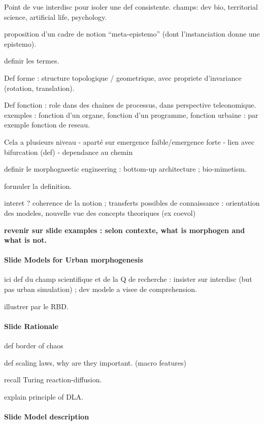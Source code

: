 \documentclass[11pt]{article}
\begin{document}
Point de vue interdisc pour isoler une def consistente. champs: dev bio, territorial science, artificial life, psychology.

proposition d'un cadre de notion ``meta-epistemo'' (dont l'instanciation donne une epistemo).

definir les termes.

Def forme : structure topologique / geometrique, avec propriete d'invariance (rotation, translation).

Def fonction : role dans des chaines de processus, dans perspective teleonomique. exemples : fonction d'un organe, fonction d'un programme, fonction urbaine : par exemple fonction de reseau.

Cela a plusieurs niveau - aparté sur emergence faible/emergence forte - lien avec bifurcation (def) - dependance au chemin

definir le morphogneetic engineering : bottom-up architecture ; bio-mimetism.

formuler la definition.

interet ? coherence de la notion ; transferts possibles de connaissance : orientation des modeles, nouvelle vue des concepts theoriques (ex coevol)

\textbf{revenir sur slide examples : selon contexte, what is morphogen and what is not.}

\paragraph{Slide Models for Urban morphogenesis}

ici def du champ scientifique et de la Q de recherche : insister sur interdisc (but pas urban simulation) ; dev modele a visee de comprehension.

illustrer par le RBD.


\paragraph{Slide Rationale}

def border of chaos

def scaling laws, why are they important. (macro features)

recall Turing reaction-diffusion.

explain principle of DLA.

\paragraph{Slide Model description}
\end{document}
